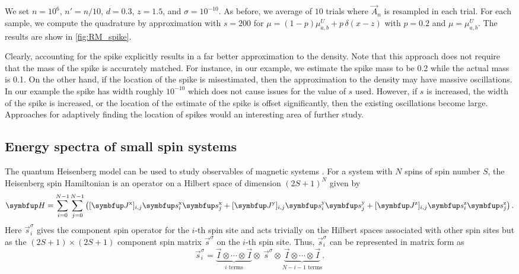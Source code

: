 We set \( n = 10^6 \), \( n' = n/10 \), \( d = 0.3 \), \( z=1.5 \), and \( \sigma = 10^{-10} \).
As before, we average of \( 10 \) trials where \( \vec{A}_n \) is resampled in each trial.
For each sample, we compute the quadrature by approximation with \( s=200 \) for \( \mu = (1-p) \mu_{a,b}^{U} + p \,\delta(x-z) \) with \( p = 0.2 \) and \( \mu = \mu_{a,b}^U \).
The results are show in \cref{fig:RM_spike}.

Clearly, accounting for the spike explicitly results in a far better approximation to the density.
Note that this approach does not require that the mass of the spike is accurately matched. 
For instance, in our example, we estimate the spike mass to be 0.2 while the actual mass is 0.1.
On the other hand, if the location of the spike is misestimated, then the approximation to the density may have massive oscillations.
In our example the spike has width roughly \( 10^{-10} \) which does not cause issues for the value of \( s \) used. 
However, if \( s \) is increased, the width of the spike is increased, or the location of the estimate of the spike is offset significantly, then the existing oscillations become large.
Approaches for adaptively finding the location of spikes would an interesting area of further study. 




\subsection{Energy spectra of small spin systems}

The quantum Heisenberg model can be used to study observables of magnetic systems \cite{weisse_wellein_alvermann_fehske_06,schnalle_schnack_10,schnack_richter_steinigeweg_20,schulter_gayk_schmidt_honecker_schnack_21,schlter_richter_schnack_22}.
For a system with \( N \) spins of spin number \( S \), the Heisenberg spin Hamiltonian is an operator on a Hilbert space of dimension \( (2S+1)^N \) given by
\begin{equation*}
    \vec{H} = \sum_{i=0}^{N-1} \sum_{j=0}^{N-1} \left( 
     [\vec{J}^{\textup{x}}]_{i,j} \vec{s}^{\textup{x}}_i  \vec{s}^{\textup{x}}_j 
    +[\vec{J}^{\textup{y}}]_{i,j}  \vec{s}^{\textup{y}}_i  \vec{s}^{\textup{y}}_j
    +[\vec{J}^{\textup{z}}]_{i,j} \vec{s}^{\textup{z}}_i  \vec{s}^{\textup{z}}_j
    \right).
\end{equation*}
Here \( \vec{s}^\sigma_i \) gives the component spin operator for the \( i \)-th spin site and acts trivially on the Hilbert spaces associated with other spin sites but as the \( (2S+1)\times (2S+1) \) component spin matrix \( \vec{s}^{\sigma} \) on the \( i \)-th spin site.
Thus, \( \vec{s}^\sigma_i \) can be represented in matrix form as
\begin{equation*}
    \vec{s}^\sigma_i
    = \underbrace{\vec{I} \otimes \cdots \otimes \vec{I}}_{i\text{ terms}} 
    \otimes ~ \vec{s}^\sigma \otimes 
    \underbrace{\vec{I} \otimes \cdots \otimes \vec{I}}_{N-i-1\text{ terms}}.
\end{equation*}

